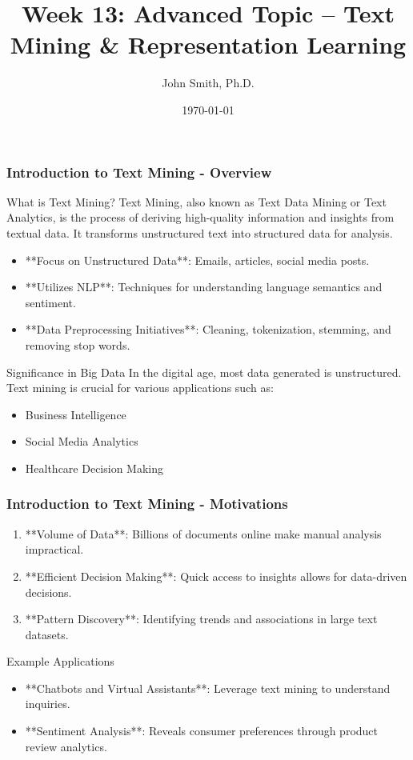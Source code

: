 \documentclass[aspectratio=169]{beamer}
\title{Week 13: Advanced Topic – Text Mining \& Representation Learning}
\author[J. Smith]{John Smith, Ph.D.}
\institute[University Name]{Department of Computer Science\\University Name\\Email: email@university.edu\\Website: www.university.edu}
\date{\today}
\begin{document}
\frame{\titlepage}

\begin{frame}[fragile]
    \frametitle{Introduction to Text Mining - Overview}
    \begin{block}{What is Text Mining?}
        Text Mining, also known as Text Data Mining or Text Analytics, is the process of deriving high-quality information and insights from textual data. It transforms unstructured text into structured data for analysis.
    \end{block}
    
    \begin{itemize}
        \item **Focus on Unstructured Data**: Emails, articles, social media posts.
        \item **Utilizes NLP**: Techniques for understanding language semantics and sentiment.
        \item **Data Preprocessing Initiatives**: Cleaning, tokenization, stemming, and removing stop words.
    \end{itemize}

    \begin{block}{Significance in Big Data}
        In the digital age, most data generated is unstructured. Text mining is crucial for various applications such as:
        \begin{itemize}
            \item Business Intelligence
            \item Social Media Analytics
            \item Healthcare Decision Making
        \end{itemize}
    \end{block}
\end{frame}

\begin{frame}[fragile]
    \frametitle{Introduction to Text Mining - Motivations}
    \begin{enumerate}
        \item **Volume of Data**: Billions of documents online make manual analysis impractical.
        \item **Efficient Decision Making**: Quick access to insights allows for data-driven decisions.
        \item **Pattern Discovery**: Identifying trends and associations in large text datasets.
    \end{enumerate}

    \begin{block}{Example Applications}
    \begin{itemize}
        \item **Chatbots and Virtual Assistants**: Leverage text mining to understand inquiries.
        \item **Sentiment Analysis**: Reveals consumer preferences through product review analytics.
    \end{itemize}
    \end{block}
\end{frame}
\end{document}
